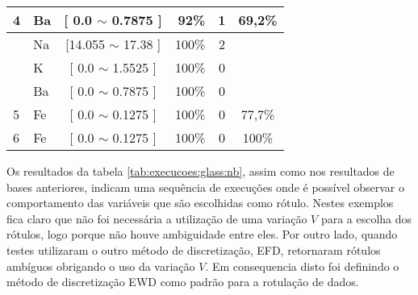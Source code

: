 \begin{table}[!h]
{\begin{tabular}{llcrcc}
\multirow{-3}{*}{4}                          & Ba    & [ 0.0 $\sim$  0.7875     ]       & 92\%                               & 1 & \multirow{-3}{*}{69,2\%} \\  \hline
                                            & Na    & [14.055 $\sim$ 17.38  ]           & 100\%                             & 2 &\\
                                            & K     & [ 0.0 $\sim$  1.5525      ]       & 100\%                               & 0 & \\  
                                            & Ba    & [ 0.0 $\sim$  0.7875     ]       & 100\%                               & 0 & \\   
\multirow{-4}{*}{5}   & Fe    & [ 0.0 $\sim$  0.1275     ]       & 100\%                               & 0 & \multirow{-4}{*}{77,7\%}\\  \hline
6                                            & Fe    & [ 0.0 $\sim$  0.1275     ]       & 100\%                               & 0 & 100\%\\  \hline

\hline

\end{tabular}
}
\end{table}

Os resultados da tabela \ref{tab:execucoes:glass:nb}, assim como nos resultados de bases anteriores, indicam uma sequência de execuções onde é possível observar o comportamento das variáveis que são escolhidas como rótulo. Nestes exemplos fica claro que não foi necessária a utilização de uma variação ${V}$ para a escolha dos rótulos, logo porque não houve ambiguidade entre eles. Por outro lado, quando testes utilizaram o outro método de discretização, EFD, retornaram rótulos ambíguos obrigando o uso da variação ${V}$. Em consequencia disto foi definindo o método de discretização EWD como padrão para a rotulação de dados.


